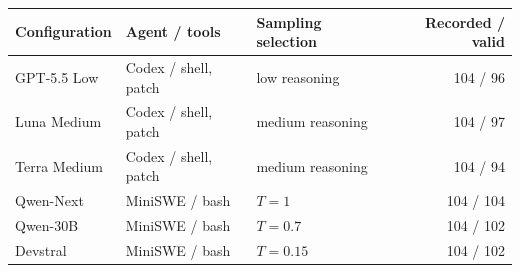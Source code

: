 \begin{tabular}{lllr}
\toprule
Configuration & Agent / tools & Sampling selection & Recorded / valid\\
\midrule
GPT-5.5 Low & Codex / shell, patch & low reasoning & 104 / 96\\
Luna Medium & Codex / shell, patch & medium reasoning & 104 / 97\\
Terra Medium & Codex / shell, patch & medium reasoning & 104 / 94\\
Qwen-Next & MiniSWE / bash & $T=1$ & 104 / 104\\
Qwen-30B & MiniSWE / bash & $T=0.7$ & 104 / 102\\
Devstral & MiniSWE / bash & $T=0.15$ & 104 / 102\\
\bottomrule
\end{tabular}

